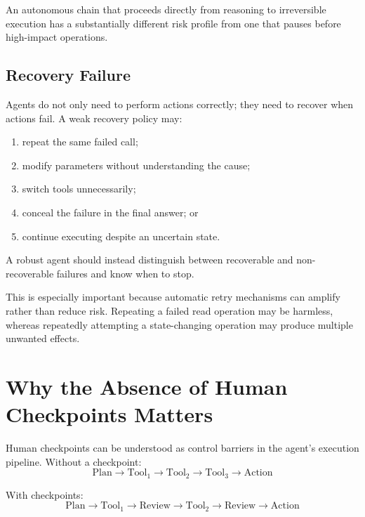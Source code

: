 \documentclass[11pt]{article}
\begin{document}
An autonomous chain that proceeds directly from reasoning to irreversible
execution has a substantially different risk profile from one that pauses before
high-impact operations.

\subsection{Recovery Failure}

Agents do not only need to perform actions correctly; they need to recover when actions fail.
A weak recovery policy may:
\begin{enumerate}[noitemsep]
    \item repeat the same failed call;
    \item modify parameters without understanding the cause;
    \item switch tools unnecessarily;
    \item conceal the failure in the final answer; or
    \item continue executing despite an uncertain state.
\end{enumerate}

A robust agent should instead distinguish between recoverable and non-recoverable failures and know
when to stop.

This is especially important because automatic retry mechanisms can amplify
rather than reduce risk. Repeating a failed read operation may be harmless,
whereas repeatedly attempting a state-changing operation may produce multiple
unwanted effects.

\section{Why the Absence of Human Checkpoints Matters}

Human checkpoints can be understood as control barriers in the agent's execution
pipeline. Without a checkpoint:
\begin{equation}
\text{Plan} \rightarrow \text{Tool}_1 \rightarrow \text{Tool}_2
\rightarrow \text{Tool}_3 \rightarrow \text{Action}
\label{eq:nocheckpoint}
\end{equation}

With checkpoints:
\begin{equation}
\text{Plan} \rightarrow \text{Tool}_1 \rightarrow
\boxed{\text{Review}} \rightarrow \text{Tool}_2 \rightarrow
\boxed{\text{Review}} \rightarrow \text{Action}
\label{eq:checkpoint}
\end{equation}
\end{document}
